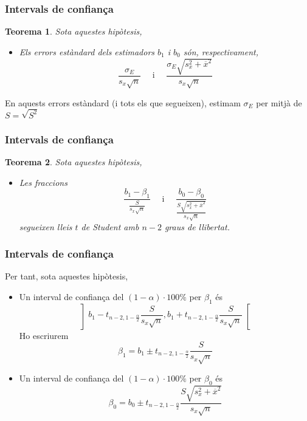 \documentclass[12pt,t]{beamer}
\theoremstyle{plain}
\newtheorem{teorema}{Teorema}
\theoremstyle{definition}
\begin{document}
\begin{frame}
\frametitle{Intervals de confiança}
\begin{teorema}
Sota aquestes hipòtesis,
\begin{itemize}
\item Els errors estàndard dels estimadors $b_1$ i $b_0$ són, respectivament,
$$
\frac{\sigma_E}{s_x\sqrt{n}}\quad\mbox{ i }\quad \frac{\sigma_E\sqrt{s_x^2+\overline{x}^2}}{s_x\sqrt{n}}
$$
\end{itemize}
\end{teorema}
\medskip

En aquests errors estàndard (i tots els que segueixen), estimam $\sigma_E$ per mitjà de $S=\sqrt{S^2}$

\end{frame}


\begin{frame}
\frametitle{Intervals de confiança}
\begin{teorema}
Sota aquestes hipòtesis,
\begin{itemize}
\item Les fraccions
$$
\frac{b_1-\beta_1}{\frac{S}{s_x\sqrt{n}}}\quad\mbox{ i }\quad
\frac{b_0-\beta_0}{\frac{S\sqrt{s_x^2+\overline{x}^2}}{s_x\sqrt{n}}}
$$
segueixen lleis $t$ de Student amb $n-2$ graus de llibertat.
\end{itemize}
\end{teorema}

\end{frame}


\begin{frame}
\frametitle{Intervals de confiança}
\vspace*{-2ex}

Per tant, sota aquestes hipòtesis,
\begin{itemize}
\item Un interval de confiança del $(1-\alpha)\cdot 100\%$ per $\beta_1$ és
$$
\left] b_1-t_{n-2,1-\frac{\alpha}{2}} \frac{S}{s_x\sqrt{n}}, b_1+t_{n-2,1-\frac{\alpha}{2}} \frac{S}{s_x\sqrt{n}}\right[
$$
Ho escriurem
$$
\beta_1=b_1\pm t_{n-2,1-\frac{\alpha}{2}} \frac{S}{s_x\sqrt{n}}
$$





\item Un interval de confiança del $(1-\alpha)\cdot 100\%$ per $\beta_0$ és
$$
\beta_0=b_0\pm t_{n-2,1-\frac{\alpha}{2}}\frac{S\sqrt{s_x^2+\overline{x}^2}}{s_x\sqrt{n}}
$$
\end{itemize}

\end{frame}
\end{document}
